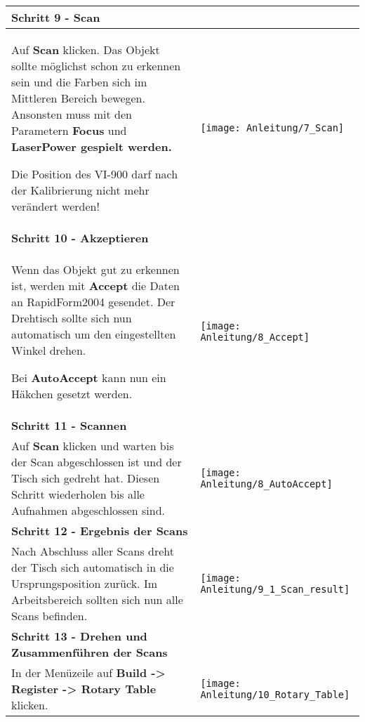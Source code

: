 \begin{longtable}{|>{\RaggedRight}m{5cm}|m{8cm}|}
\pagebreak 


\multicolumn{2}{|l|}%
{{\textbf{Schritt 9 - Scan}}}
\\ \hline
Auf \textbf{Scan} klicken. \linebreak
Das Objekt sollte möglichst schon zu erkennen sein und die Farben sich im Mittleren Bereich bewegen. \linebreak
Ansonsten muss mit den Parametern \textbf{Focus} und \textbf{LaserPower gespielt werden.}
\begin{TippS}Die Position des VI-900 darf nach der Kalibrierung nicht mehr verändert werden!\end{TippS}
& 
\texttt{[image: Anleitung/7\_Scan]}
\\ \hline  

\multicolumn{2}{|l|}%
{{\textbf{Schritt 10 - Akzeptieren}}}
\\ \hline
Wenn das Objekt gut zu erkennen ist, werden mit \textbf{Accept} die Daten an RapidForm2004 gesendet. Der Drehtisch sollte sich nun automatisch um den eingestellten Winkel drehen. 
\begin{TippS}Bei \textbf{AutoAccept} kann nun ein Häkchen gesetzt werden.\end{TippS}
& 
\texttt{[image: Anleitung/8\_Accept]}
\\ \hline  

\pagebreak 


\multicolumn{2}{|l|}%
{{\textbf{Schritt 11 - Scannen}}}
\\ \hline
Auf \textbf{Scan} klicken und warten bis der Scan abgeschlossen ist und der Tisch sich gedreht hat.\linebreak
Diesen Schritt wiederholen bis alle Aufnahmen abgeschlossen sind.\linebreak
& 
\texttt{[image: Anleitung/8\_AutoAccept]}
\\ \hline  

\multicolumn{2}{|l|}%
{{\textbf{Schritt 12 - Ergebnis der Scans}}}
\\ \hline
Nach Abschluss aller Scans dreht der Tisch sich automatisch in die Ursprungsposition zurück.\linebreak
Im Arbeitsbereich sollten sich nun alle Scans befinden.
& 
\texttt{[image: Anleitung/9\_1\_Scan\_result]}
\\ \hline  

\pagebreak 


\multicolumn{2}{|l|}%
{{\textbf{Schritt 13 - Drehen und Zusammenführen der Scans}}}
\\ \hline
In der Menüzeile auf \textbf{Build -> Register -> Rotary Table} klicken.\linebreak
& 
\texttt{[image: Anleitung/10\_Rotary\_Table]}
\\ \hline  


\end{longtable}
